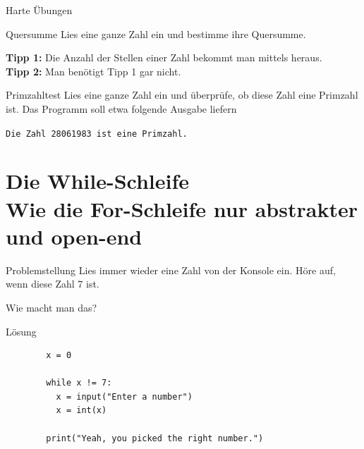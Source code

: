 \begin{frame}{Harte Übungen}

\begin{block}{Quersumme}
	\vspace{2pt}
	Lies eine ganze Zahl  ein und bestimme ihre Quersumme. 
	
	\textbf{Tipp 1:} Die Anzahl der Stellen einer Zahl bekommt man mittels  heraus. \\
	\textbf{Tipp 2:} Man benötigt Tipp 1 gar nicht.  
	
\end{block}

\vspace{12pt}
\pause

\begin{block}{Primzahltest}
	\vspace{2pt}
	Lies eine ganze Zahl  ein und überprüfe, ob diese Zahl eine Primzahl ist. Das Programm soll etwa folgende Ausgabe liefern 
	
	\texttt{Die Zahl 28061983 ist eine Primzahl.}
\end{block}

\end{frame}


\section{Die While-Schleife \\ \footnotesize Wie die For-Schleife nur abstrakter und open-end}

\begin{frame}
\begin{block}{Problemstellung}
	\vspace{2pt}
	Lies immer wieder eine Zahl von der Konsole ein. Höre auf, wenn diese Zahl 7 ist. 
	
	Wie macht man das? 
\end{block}
\end{frame}

\begin{fragile}
	
\begin{block}{Lösung}
		\vspace{2pt}
		
	\begin{verbatim}
		x = 0
		
		while x != 7: 
		  x = input("Enter a number")
		  x = int(x)
		  
		print("Yeah, you picked the right number.")
	\end{verbatim}
	
\end{block}
\end{fragile}


